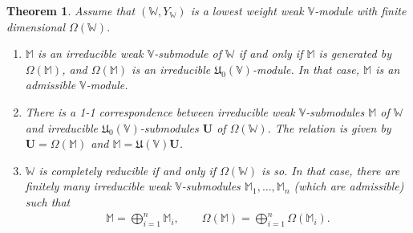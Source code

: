 \documentclass[12pt,a4paper,notitlepage]{report}
\theoremstyle{definition}
\theoremstyle{plain}
\newtheorem{thm}[df]{Theorem}
\newcommand{\fk}{\mathfrak}
\newcommand{\mbf}{\mathbf}
\newcommand{\Vbb}{\mathbb V}
\newcommand{\Wbb}{\mathbb W}
\newcommand{\Mbb}{\mathbb M}
\numberwithin{equation}{section}
\begin{document}
\begin{thm}\label{lb102}
Assume that $(\Wbb,Y_\Wbb)$ is a lowest weight weak $\Vbb$-module with finite dimensional $\Omega(\Wbb)$.
\begin{enumerate}[label=(\arabic*)] 
\item $\Mbb$ is an irreducible weak $\Vbb$-submodule of $\Wbb$ if and only if $\Mbb$ is generated by $\Omega(\Mbb)$, and $\Omega(\Mbb)$ is an irreducible $\fk U_0(\Vbb)$-module.  In that case, $\Mbb$ is an admissible $\Vbb$-module.

\item There is a 1-1 correspondence between irreducible weak $\Vbb$-submodules $\Mbb$ of $\Wbb$ and irreducible $\fk U_0(\Vbb)$-submodules $\mbf U$ of $\Omega(\Wbb)$. The relation is given by $\mbf U=\Omega(\Mbb)$ and $\Mbb=\fk U(\Vbb)\mbf U$.



\item $\Wbb$ is completely reducible if and only if $\Omega(\Wbb)$ is so. In that case, there are finitely many irreducible weak $\Vbb$-submodules  $\Mbb_1,\dots,\Mbb_n$ (which are admissible) such that
\begin{gather*}
\Mbb=\bigoplus_{i=1}^n\Mbb_i,\qquad\Omega(\Mbb)=\bigoplus_{i=1}^n\Omega(\Mbb_i).
\end{gather*}
\end{enumerate}	
\end{thm}
\end{document}
